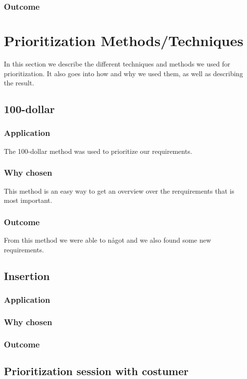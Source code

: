 \documentclass[a4paper]{article}
\begin{document}
			\subsubsection{Outcome}
			

	\section{Prioritization Methods/Techniques}
	In this section we describe the different techniques and methods we used for prioritization. It also goes into how and why we used them, as well as describing the result.

	\subsection{100-dollar}
		\subsubsection{Application}
			The 100-dollar method was used to prioritize our requirements. 
		\subsubsection{Why chosen}
			This method is an easy way to get an overview over the rerquirements that is most important.
		\subsubsection{Outcome}
			From this method we were able to något and we also found some new requirements.

	\subsection{Insertion}
		\subsubsection{Application}
		\subsubsection{Why chosen}
		\subsubsection{Outcome}
		
	\subsection{Prioritization session with costumer}
\end{document}
